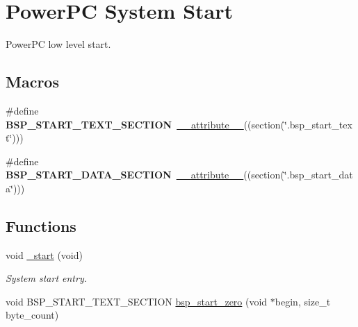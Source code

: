 \hypertarget{group__RTEMSBSPsPowerPCSharedStart}{}\section{Power\+PC System Start}
\label{group__RTEMSBSPsPowerPCSharedStart}


Power\+PC low level start.  


\subsection*{Macros}
\begin{DoxyCompactItemize}
\item 
\mbox{\label{group__RTEMSBSPsPowerPCSharedStart_gab4770e6e31de9d52c014827e6be91391}} 
\#define {\bfseries B\+S\+P\+\_\+\+S\+T\+A\+R\+T\+\_\+\+T\+E\+X\+T\+\_\+\+S\+E\+C\+T\+I\+ON}~\mbox{\hyperlink{struct____attribute____}{\+\_\+\+\_\+attribute\+\_\+\+\_\+}}((section(\char`\"{}.bsp\+\_\+start\+\_\+text\char`\"{})))
\item 
\mbox{\label{group__RTEMSBSPsPowerPCSharedStart_ga1e04714d4b5de7f9f4f971b9f5ae48c8}} 
\#define {\bfseries B\+S\+P\+\_\+\+S\+T\+A\+R\+T\+\_\+\+D\+A\+T\+A\+\_\+\+S\+E\+C\+T\+I\+ON}~\mbox{\hyperlink{struct____attribute____}{\+\_\+\+\_\+attribute\+\_\+\+\_\+}}((section(\char`\"{}.bsp\+\_\+start\+\_\+data\char`\"{})))
\end{DoxyCompactItemize}
\subsection*{Functions}
\begin{DoxyCompactItemize}
\item 
\mbox{\label{group__RTEMSBSPsPowerPCSharedStart_ga8b67a6ff3f33fae9b3f1b142005c0bc2}} 
void \mbox{\hyperlink{group__RTEMSBSPsPowerPCSharedStart_ga8b67a6ff3f33fae9b3f1b142005c0bc2}{\+\_\+start}} (void)
\begin{DoxyCompactList}\small\item\em System start entry. \end{DoxyCompactList}\item 
void B\+S\+P\+\_\+\+S\+T\+A\+R\+T\+\_\+\+T\+E\+X\+T\+\_\+\+S\+E\+C\+T\+I\+ON \mbox{\hyperlink{group__RTEMSBSPsPowerPCSharedStart_ga22b00d272dd9b2ab44e34f0b86245c38}{bsp\+\_\+start\+\_\+zero}} (void $\ast$begin, size\+\_\+t byte\+\_\+count)
\end{DoxyCompactItemize}

